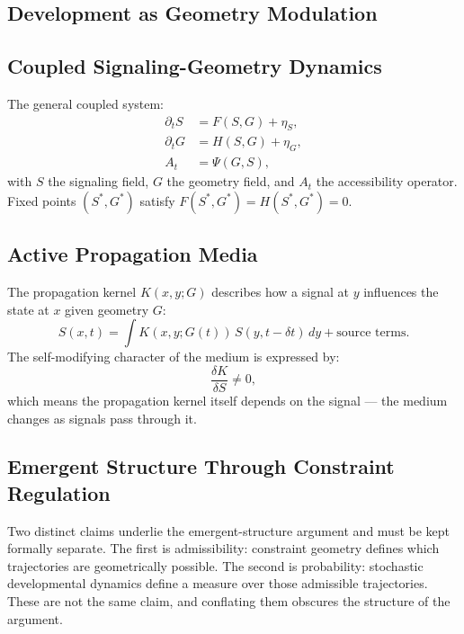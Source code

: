 \documentclass[12pt, a4paper, openany]{book}
\theoremstyle{definition}
\theoremstyle{remark}
\begin{document}
\begin{appendices}
\chapter{Development as Geometry Modulation}

\section{Coupled Signaling-Geometry Dynamics}

The general coupled system:
\begin{align}
\partial_t S &= F(S,G) + \eta_S, \\
\partial_t G &= H(S,G) + \eta_G, \\
A_t &= \Psi(G,S),
\end{align}
with $S$ the signaling field, $G$ the geometry field, and $A_t$ the accessibility operator. Fixed points $(S^*,G^*)$ satisfy $F(S^*,G^*) = H(S^*,G^*) = 0$.

\section{Active Propagation Media}

The propagation kernel $K(x,y;G)$ describes how a signal at $y$ influences the state at $x$ given geometry $G$:
\begin{equation}
S(x,t) = \int K(x,y;G(t))\,S(y,t-\delta t)\,dy + \text{source terms}.
\end{equation}
The self-modifying character of the medium is expressed by:
\begin{equation}
\frac{\delta K}{\delta S} \neq 0,
\end{equation}
which means the propagation kernel itself depends on the signal — the medium changes as signals pass through it.

\section{Emergent Structure Through Constraint Regulation}

Two distinct claims underlie the emergent-structure argument and must be kept formally separate. The first is admissibility: constraint geometry defines which trajectories are geometrically possible. The second is probability: stochastic developmental dynamics define a measure over those admissible trajectories. These are not the same claim, and conflating them obscures the structure of the argument.


\end{appendices}
\end{document}
